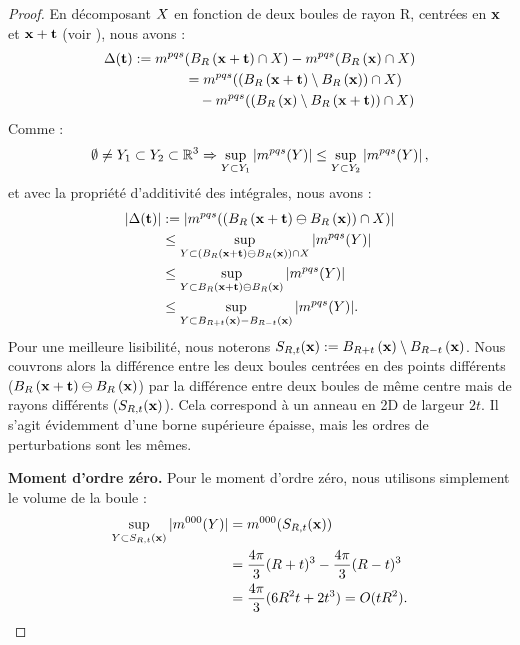 \begin{proof}
En décomposant $X$ en fonction de deux boules de rayon R, centrées en $\mathbf{x}$
et $\mathbf{x} + \mathbf{t}$ (voir ), nous avons :
%
\begin{align}
  \Delta(\mathbf{t}) := m^{pqs}&(B_{R}\left(\mathbf{x}+\mathbf{t}\right) \cap X ) - m^{pqs}(B_{R}\left(\mathbf{x}\right) \cap X ) \\
    &= m^{pqs}( (B_{R}\left(\mathbf{x}+\mathbf{t}\right) \setminus B_{R}\left(\mathbf{x}\right)) \cap X ) \\
    & \quad - m^{pqs}( (B_{R}\left(\mathbf{x}\right) \setminus B_{R}\left(\mathbf{x}+\mathbf{t}\right)) \cap X )
\end{align}
%
Comme :
%
\begin{equation}
  \emptyset \neq Y_1 \subset Y_2 \subset \mathbb{R}^3 \Rightarrow \sup_{ Y \subset Y_1} \left | m^{pqs}(Y) \right| \le \sup_{Y \subset Y_2} \left| m^{pqs}(Y)\right |,
\end{equation}
%
et avec la propriété d'additivité des intégrales, nous avons :
%
\begin{align}
  |\Delta(\mathbf{t})| &:= |m^{pqs}( (B_{R}\left(\mathbf{x}+\mathbf{t}\right) \ominus B_{R}\left(\mathbf{x}\right)) \cap X )| \\
  &\le \sup_{Y \subset (B_{R}\left(\mathbf{x}+\mathbf{t}\right) \ominus B_{R}\left(\mathbf{x}\right)) \cap X} |m^{pqs}(Y)|\\
  &\le \sup_{Y \subset B_{R}\left(\mathbf{x}+\mathbf{t}\right) \ominus B_{R}\left(\mathbf{x}\right)} |m^{pqs}(Y)|\\
  &\le \sup_{Y \subset B_{R+t}\left(\mathbf{x}\right) - B_{R-t}\left(\mathbf{x}\right)} |m^{pqs}(Y)|.
\end{align}
%
Pour une meilleure lisibilité, nous noterons $S_{R,t}(\mathbf{x}) :=
B_{R+t}\left(\mathbf{x}\right) \setminus B_{R-t}\left(\mathbf{x}\right)$. Nous couvrons alors la différence
entre les deux boules centrées en des points différents ($B_{R}\left(\mathbf{x}+\mathbf{t}\right)
\ominus B_{R}\left(\mathbf{x}\right)$) par la différence entre deux boules de même centre mais
de rayons différents ($S_{R,t}(\mathbf{x})$).  Cela correspond à un anneau en 2D de largeur $2t$. Il s'agit évidemment
d'une borne supérieure épaisse, mais les ordres de perturbations sont les mêmes.


\noindent\textbf{Moment d'ordre zéro.\quad}
%
Pour le moment d'ordre zéro, nous utilisons simplement le volume de la boule :
%
\begin{align}
  \sup_{Y \subset S_{R,t}(\mathbf{x})} |m^{000}(Y)|
  &= m^{000}( S_{R,t}(\mathbf{x}) ) \\
  &= \frac{4\pi}{3}(R+t)^3 - \frac{4\pi}{3}(R-t)^3 \\
  &= \frac{4\pi}{3}(6R^2t+2t^3)=O(tR^2).
\end{align}



\end{proof}
